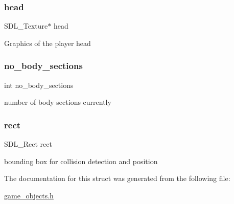 \subsubsection{\texorpdfstring{head}{head}}
{\footnotesize\ttfamily S\+D\+L\+\_\+\+Texture$\ast$ head}

Graphics of the player head \mbox{\label{structplayer__object_a06948963e49fd8de64945937788fc3f8}} 
\subsubsection{\texorpdfstring{no\_body\_sections}{no\_body\_sections}}
{\footnotesize\ttfamily int no\+\_\+body\+\_\+sections}

number of body sections currently \mbox{\label{structplayer__object_a55aefd071649ac9dd8133e2d8a52d11f}} 
\subsubsection{\texorpdfstring{rect}{rect}}
{\footnotesize\ttfamily S\+D\+L\+\_\+\+Rect rect}

bounding box for collision detection and position 

The documentation for this struct was generated from the following file\+:\begin{DoxyCompactItemize}
\item 
\mbox{\hyperlink{game__objects_8h}{game\+\_\+objects.\+h}}\end{DoxyCompactItemize}

